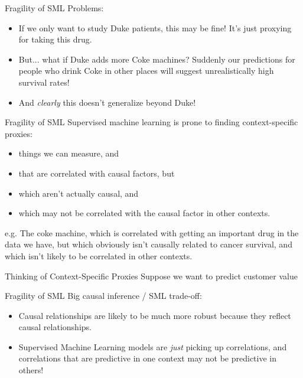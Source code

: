 \documentclass[11pt,handout]{beamer}
\begin{document}
\begin{frame}[c]{Fragility of SML}
Problems:
\begin{itemize}
  \item If we only want to study Duke patients, this may be fine! It's just proxying for taking this drug.
  \item But... what if Duke adds more Coke machines? Suddenly our predictions for people who drink Coke in other places will suggest unrealistically high survival rates!
  \item And \emph{clearly} this doesn't generalize beyond Duke!
\end{itemize}
\end{frame}

\begin{frame}[c]{Fragility of SML}
Supervised machine learning is prone to finding \alert{context-specific proxies}:
\begin{itemize}
  \item things we can measure, and
  \item that are correlated with causal factors, but
  \item which aren't actually causal, and
  \item which may not be correlated with the causal factor in other contexts.
\end{itemize}
\pause e.g. The coke machine, which is correlated with getting an important drug in the data we have, but which obviously isn't causally related to cancer survival, and which isn't likely to be correlated in other contexts.
\end{frame}

\begin{frame}[c]{Thinking of Context-Specific Proxies}
Suppose we want to predict customer value
\end{frame}


\begin{frame}[c]{Fragility of SML}
Big causal inference / SML trade-off:
\begin{itemize}
  \pause \item Causal relationships are likely to be much more robust because they reflect causal relationships.
  \pause \item Supervised Machine Learning models are \emph{just} picking up correlations, and correlations that are predictive in one context may not be predictive in others!
\end{itemize}
\end{frame}
\end{document}
